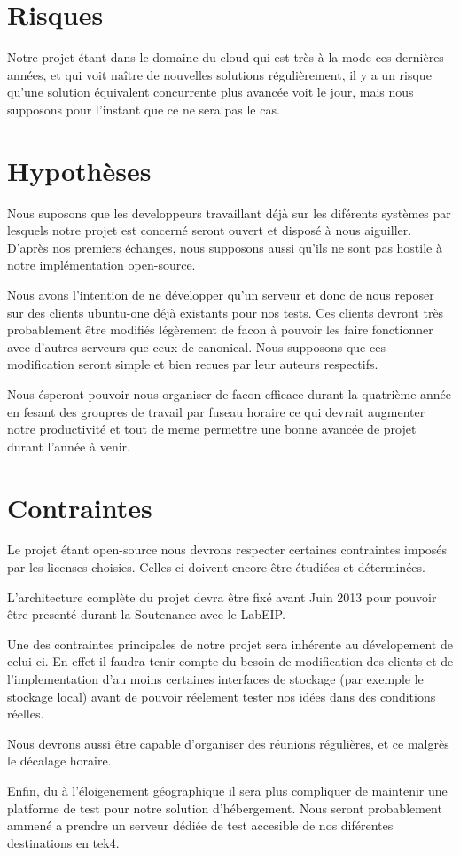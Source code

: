 \section{Risques}
Notre projet étant dans le domaine du cloud qui est très à la mode ces dernières années, et qui voit naître de nouvelles solutions régulièrement, il y a un risque qu'une solution équivalent concurrente plus avancée voit le jour, mais nous supposons pour l'instant que ce ne sera pas le cas.

\section{Hypothèses}
Nous suposons que les developpeurs travaillant déjà sur les diférents systèmes par lesquels notre projet est concerné seront ouvert et disposé à nous aiguiller. D'après nos premiers échanges, nous supposons aussi qu'ils ne sont pas hostile à notre implémentation open-source.

Nous avons l'intention de ne développer qu'un serveur et donc de nous reposer sur des clients ubuntu-one déjà existants pour nos tests. Ces clients devront très probablement être modifiés légèrement de facon à pouvoir les faire fonctionner avec d'autres serveurs que ceux de canonical. Nous supposons que ces modification seront simple et bien recues par leur auteurs respectifs.

Nous ésperont pouvoir nous organiser de facon efficace durant la quatrième année en fesant des groupres de travail par fuseau horaire ce qui devrait augmenter notre productivité et tout de meme permettre une bonne avancée de projet durant l'année à venir.

\section{Contraintes}
Le projet étant open-source nous devrons respecter certaines contraintes imposés par les licenses choisies. Celles-ci doivent encore être étudiées et déterminées.

L'architecture complète du projet devra être fixé avant Juin 2013 pour pouvoir être presenté durant la Soutenance avec le LabEIP.

Une des contraintes principales de notre projet sera inhérente au dévelopement de celui-ci. En effet il faudra tenir compte du besoin de modification des clients et de l'implementation d'au moins certaines interfaces de stockage (par exemple le stockage local) avant de pouvoir réelement tester nos idées dans des conditions réelles.

Nous devrons aussi être capable d'organiser des réunions régulières, et ce malgrès le décalage horaire.

Enfin, du à l'éloigenement géographique il sera plus compliquer de maintenir une platforme de test pour notre solution d'hébergement. Nous seront probablement ammené a prendre un serveur dédiée de test accesible de nos diférentes destinations en tek4.

